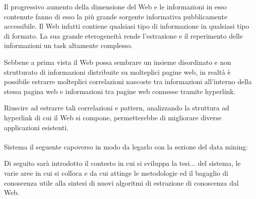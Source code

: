 


Il progressivo aumento della dimensione del Web e le informazioni in esso contenute fanno di esso la più grande sorgente informativa pubblicamente accessibile. Il Web infatti contiene qualsiasi tipo di informazione in qualsiasi tipo di formato. 
La sua grande eterogeneità rende l'estrazione e il reperimento delle informazioni un task altamente complesso. 

Sebbene a prima vista il Web possa sembrare un insieme disordinato e non strutturato di informazioni distribuite su molteplici pagine web, in realtà è possibile estrarre molteplici correlazioni nascoste tra informazioni all'interno della stessa pagina web e informazioni tra pagine web connesse tramite hyperlink.

Riuscire ad estrarre tali correlazioni e pattern, analizzando la struttura ad hyperlink di cui il Web si compone, permetterebbe di migliorare diverse applicazioni esistenti.
\\\\
\color{red}
Sistema il seguente capoverso in modo da legarlo con 
la sezione del data mining:

\color{black}
Di seguito sarà introdotto il \color{red}contesto in cui si sviluppa la tesi... del sistema, le varie aree in cui si colloca \color{black} e da cui attinge le metodologie ed il bagaglio di conoscenza utile alla sintesi di nuovi algoritmi di estrazione di conoscenza dal Web.
